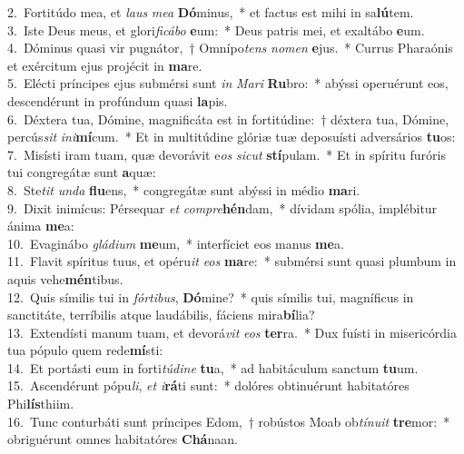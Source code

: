 {2.~}Fortitúdo mea, et \textit{laus} \textit{me}\textit{a} \textbf{Dó}minus,~* et factus est mihi in sa\textbf{lú}tem.\\
{3.~}Iste Deus meus, et glori\textit{fi}\textit{cá}\textit{bo} \textbf{e}um:~* Deus patris mei, et exaltábo \textbf{e}um.\\
{4.~}Dóminus quasi vir pugnátor,~† Omnípo\textit{tens} \textit{no}\textit{men} \textbf{e}jus.~* Currus Pharaónis et exércitum ejus projécit in \textbf{ma}re.\\
{5.~}Elécti príncipes ejus submérsi sunt \textit{in} \textit{Ma}\textit{ri} \textbf{Ru}bro:~* abýssi operuérunt eos, descendérunt in profúndum quasi \textbf{la}pis.\\
{6.~}Déxtera tua, Dómine, magnificáta est in fortitúdine:~† déxtera tua, Dómine, percús\textit{sit} \textit{i}\textit{ni}\textbf{mí}cum.~* Et in multitúdine glóriæ tuæ deposuísti adversários \textbf{tu}os:\\
{7.~}Misísti iram tuam, quæ devorávit e\textit{os} \textit{si}\textit{cut} \textbf{stí}pulam.~* Et in spíritu furóris tui congregátæ sunt \textbf{a}quæ:\\
{8.~}Ste\textit{tit} \textit{un}\textit{da} \textbf{flu}ens,~* congregátæ sunt abýssi in médio \textbf{ma}ri.\\
{9.~}Dixit inimícus: Pérsequar \textit{et} \textit{com}\textit{pre}\textbf{hén}dam,~* dívidam spólia, implébitur ánima \textbf{me}a:\\
{10.~}Evaginábo \textit{glá}\textit{di}\textit{um} \textbf{me}um,~* interfíciet eos manus \textbf{me}a.\\
{11.~}Flavit spíritus tuus, et opéru\textit{it} \textit{e}\textit{os} \textbf{ma}re:~* submérsi sunt quasi plumbum in aquis vehe\textbf{mén}tibus.\\
{12.~}Quis símilis tui in \textit{fór}\textit{ti}\textit{bus}, \textbf{Dó}mine?~* quis símilis tui, magníficus in sanctitáte, terríbilis atque laudábilis, fáciens mira\textbf{bí}lia?\\
{13.~}Extendísti manum tuam, et devorá\textit{vit} \textit{e}\textit{os} \textbf{ter}ra.~* Dux fuísti in misericórdia tua pópulo quem rede\textbf{mí}sti:\\
{14.~}Et portásti eum in forti\textit{tú}\textit{di}\textit{ne} \textbf{tu}a,~* ad habitáculum sanctum \textbf{tu}um.\\
{15.~}Ascendérunt pópu\textit{li}, \textit{et} \textit{i}\textbf{rá}ti sunt:~* dolóres obtinuérunt habitatóres Phi\textbf{lís}thiim.\\
{16.~}Tunc conturbáti sunt príncipes Edom,~† robústos Moab ob\textit{tí}\textit{nu}\textit{it} \textbf{tre}mor:~* obriguérunt omnes habitatóres \textbf{Chá}naan.\\
